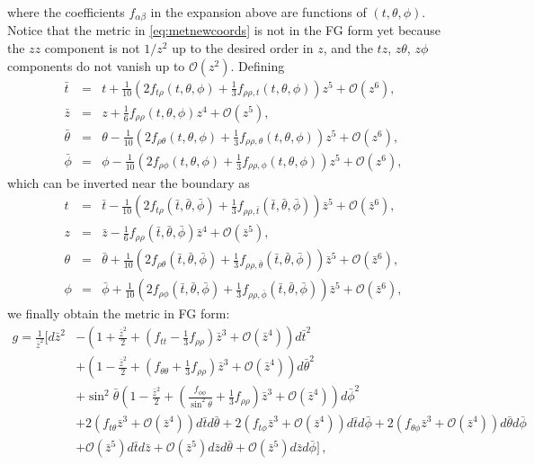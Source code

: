 \documentclass[a4paper,11pt]{article}
\numberwithin{equation}{section}
\begin{document}
where the coefficients $f_{\alpha\beta}$ in the expansion above are functions of $(t,\theta,\phi)$. 
Notice that the metric in \eqref{eq:metnewcoords} is not in the FG form yet because the $zz$ component is not $1/z^2$ up to the desired order in $z$, and the $tz$, $z\theta$, $z\phi$ components do not vanish up to $\mathcal{O}(z^2)$.
Defining 
\begin{eqnarray}
\label{eqn:FGcoords}
\bar{t}&=&t+\frac{1}{10 } \left(2 f_{t\rho}(t,\theta,\phi)+\frac{1}{3}f_{\rho\rho,t}(t,\theta,\phi)\right)z^5+\mathcal{O}(z^6),\\
\bar{z}&=&z+\frac{1}{6}f_{\rho\rho}(t,\theta,\phi)z^4+\mathcal{O}(z^5),\\
\bar{\theta}&=&\theta-\frac{1}{10} \left(2 f_{\rho\theta}(t,\theta,\phi)+\frac{1}{3}f_{\rho\rho,\theta}(t,\theta,\phi)\right)z^5+\mathcal{O}(z^6),\\
\bar{\phi}&=&\phi-\frac{1}{10} \left(2 f_{\rho\phi}(t,\theta,\phi)+\frac{1}{3}f_{\rho\rho,\phi}(t,\theta,\phi)\right)z^5+\mathcal{O}(z^6),
\end{eqnarray}
which can be inverted near the boundary as
\begin{eqnarray}
\label{eqn:invertFGcoords}
t&=&\bar{t}-\frac{1}{10} \left(2 f_{t\rho}(\bar{t},\bar{\theta},\bar{\phi})+\frac{1}{3}f_{\rho\rho,\bar{t}}(\bar{t},\bar{\theta},\bar{\phi})\right)\bar{z}^5+\mathcal{O}(\bar{z}^6),\\
z&=&\bar{z}-\frac{1}{6}f_{\rho\rho}(\bar{t},\bar{\theta},\bar{\phi})\bar{z}^4+\mathcal{O}(\bar{z}^5),\\
\theta&=&\bar{\theta}+\frac{1}{10} \left(2 f_{\rho\theta}(\bar{t},\bar{\theta},\bar{\phi})+\frac{1}{3}f_{\rho\rho,\bar{\theta}}(\bar{t},\bar{\theta},\bar{\phi})\right)\bar{z}^5+\mathcal{O}(\bar{z}^6),\\
\phi&=&\bar{\phi}+\frac{1}{10} \left(2 f_{\rho\phi}(\bar{t},\bar{\theta},\bar{\phi})+\frac{1}{3}f_{\rho\rho,\bar{\phi}}(\bar{t},\bar{\theta},\bar{\phi})\right)\bar{z}^5+\mathcal{O}(\bar{z}^6),
\end{eqnarray}
we finally obtain the metric in FG form:
\begin{align}
g=\frac{1}{\bar{z}^2}\biggl[ d\bar{z}^2 &-\left(1+\frac{\bar{z}^2}{2}+\left( \textstyle{f_{tt}-\frac{1}{3}f_{\rho\rho}}\right)\bar{z}^3+\mathcal{O}(\bar{z}^4) \right)d\bar{t}^2 \nonumber \\
&+ \left(1-\frac{\bar{z}^2}{2}+\left(\textstyle{f_{\theta\theta}+\frac{1}{3}f_{\rho\rho}} \right)\bar{z}^3 +\mathcal{O}(\bar{z}^4)\right)d\bar{\theta}^2\nonumber\\
& +  \sin^2\bar{\theta} \left(1-\frac{\bar{z}^2}{2}+\left(\textstyle{\frac{f_{\phi\phi}}{ \sin^2\bar{\theta}}+\frac{1}{3}f_{\rho\rho}}\right)\bar{z}^3 +\mathcal{O}(\bar{z}^4)\right)d\bar{\phi}^2\nonumber\\
&+ 2 \left(f_{t\theta}\bar{z}^3 +\mathcal{O}(\bar{z}^4) \right) d\bar{t} d\bar{\theta} + 2 \left( f_{t\phi}\bar{z}^3 +\mathcal{O}(\bar{z}^4)\right)d\bar{t} d\bar{\phi} + 2\left( f_{\theta\phi} \bar{z}^3+\mathcal{O}(\bar{z}^4)\right)d\bar{\theta} d\bar{\phi} 
\nonumber\\
&+\mathcal{O}(\bar{z}^5)d\bar{t}d\bar{z}+\mathcal{O}(\bar{z}^5)d\bar{z}d\bar{\theta}+\mathcal{O}(\bar{z}^5)d\bar{z}d\bar{\phi}
\biggr]\,,
\label{eq:asyFG}
\end{align}
\end{document}
